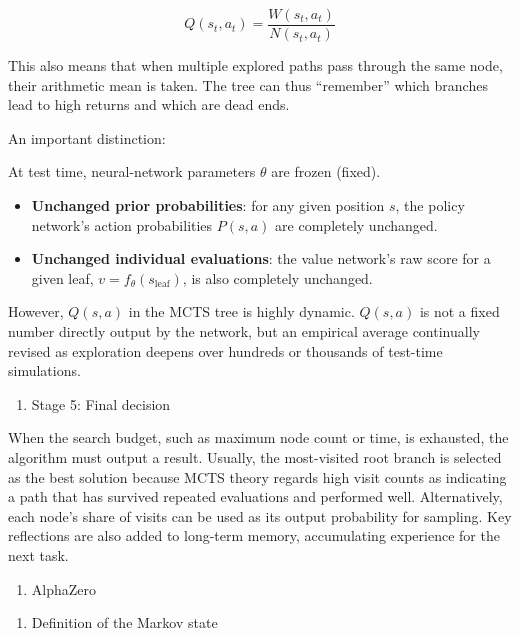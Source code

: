 \[
Q(s_t,a_t)=\frac{W(s_t,a_t)}{N(s_t,a_t)}
\]

This also means that when multiple explored paths pass through the same node, their arithmetic mean is taken. The tree can thus ``remember'' which branches lead to high returns and which are dead ends.

An important distinction:

At test time, neural-network parameters \(\theta\) are frozen (fixed).

\begin{itemize}
\tightlist
\item
  \textbf{Unchanged prior probabilities}: for any given position \(s\), the policy network's action probabilities \(P(s,a)\) are completely unchanged.
\item
  \textbf{Unchanged individual evaluations}: the value network's raw score for a given leaf, \(v=f_\theta(s_{\mathrm{leaf}})\), is also completely unchanged.
\end{itemize}

However, \(Q(s,a)\) in the MCTS tree is highly dynamic. \(Q(s,a)\) is not a fixed number directly output by the network, but an empirical average continually revised as exploration deepens over hundreds or thousands of test-time simulations.

\begin{enumerate}
\def\labelenumi{(\arabic{enumi})}
\setcounter{enumi}{4}
\tightlist
\item
  Stage 5: Final decision
\end{enumerate}

When the search budget, such as maximum node count or time, is exhausted, the algorithm must output a result. Usually, the most-visited root branch is selected as the best solution because MCTS theory regards high visit counts as indicating a path that has survived repeated evaluations and performed well. Alternatively, each node's share of visits can be used as its output probability for sampling. Key reflections are also added to long-term memory, accumulating experience for the next task.

\begin{enumerate}
\def\labelenumi{\arabic{enumi}.}
\setcounter{enumi}{1}
\tightlist
\item
  AlphaZero
\end{enumerate}

\begin{enumerate}
\def\labelenumi{(\arabic{enumi})}
\tightlist
\item
  Definition of the Markov state
\end{enumerate}

